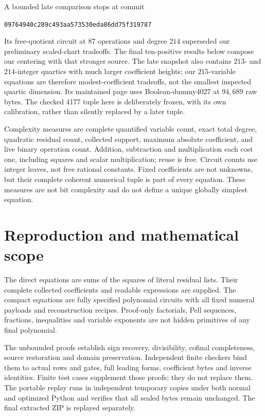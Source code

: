 \documentclass[11pt]{article}
\theoremstyle{definition}\newtheorem{definition}[theorem]{Definition}
\theoremstyle{remark}\newtheorem{remark}[theorem]{Remark}
\begin{document}
A bounded late comparison stops at commit
\begin{center}\small\texttt{09764940c289c493aa573530eda86dd75f319787}\end{center}
Its free-quotient circuit at $87$ operations and degree $214$ superseded
our preliminary scaled-chart tradeoffs. The final ten-positive results
below compose our centering with that stronger source. The late snapshot
also contains $213$- and $214$-integer quartics with much larger coefficient
heights; our $215$-variable equations are therefore modest-coefficient
tradeoffs, not the smallest inspected quartic dimension. Its maintained
page uses Boolean-dummy4027 at $94{,}689$ raw bytes. The checked 4177 tuple
here is deliberately frozen, with its own calibration, rather than silently
replaced by a later tuple.

Complexity measures are complete quantified variable count, exact total
degree, quadratic residual count, collected support, maximum absolute
coefficient, and live binary operation count. Addition, subtraction and
multiplication each cost one, including squares and scalar multiplication;
reuse is free. Circuit counts use integer leaves, not free rational
constants. Fixed coefficients are not unknowns, but their complete coherent
numerical tuple is part of every equation. These measures are not bit
complexity and do not define a unique globally simplest equation.






\section{Reproduction and mathematical scope}
The direct equations are sums of the squares of literal residual lists.
Their complete collected coefficients and readable expressions are supplied.
The compact equations are fully specified polynomial circuits with all
fixed numeral payloads and reconstruction recipes. Proof-only factorials,
Pell sequences, fractions, inequalities and variable exponents are not
hidden primitives of any final polynomial.

The unbounded proofs establish sign recovery, divisibility, cofinal
completeness, source restoration and domain preservation. Independent finite
checkers bind them to actual rows and gates, full leading forms, coefficient
bytes and inverse identities. Finite test cases supplement those proofs;
they do not replace them. The portable replay runs in independent temporary
copies under both normal and optimized Python and verifies that all sealed
bytes remain unchanged. The final extracted ZIP is replayed separately.
\end{document}
